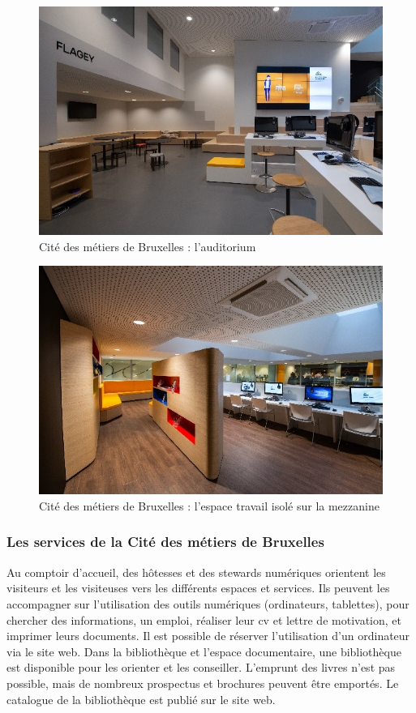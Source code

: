 \documentclass[french,a4paper,12pt]{article}
\begin{document}
{\begin{figure}
\end{figure}
\begin{figure}
\caption{Cité des métiers de Bruxelles : l'auditorium}
\includegraphics[scale=0.9]{5-cdm-auditorium.JPG}
\end{figure}
\begin{figure}
\caption{Cité des métiers de Bruxelles : l'espace travail isolé sur la mezzanine }
\includegraphics[scale=0.9]{6-cdm-espace_de_travail.JPG}
\end{figure}



\subsubsection{Les services de la Cité des métiers de Bruxelles}

\quad Au comptoir d’accueil, des hôtesses et des stewards numériques orientent les visiteurs et les visiteuses vers les différents espaces et services. Ils peuvent les accompagner sur l’utilisation des outils numériques (ordinateurs, tablettes), pour chercher des informations, un emploi, réaliser leur cv et lettre de motivation, et imprimer leurs documents. Il est possible de réserver l’utilisation d’un ordinateur via le site web.
\quad Dans la bibliothèque et l’espace documentaire, une bibliothèque est disponible pour les orienter et les conseiller. L’emprunt des livres n’est pas possible, mais de nombreux prospectus et brochures peuvent être emportés. Le catalogue de la bibliothèque est publié sur le site web.

}
\end{document}
